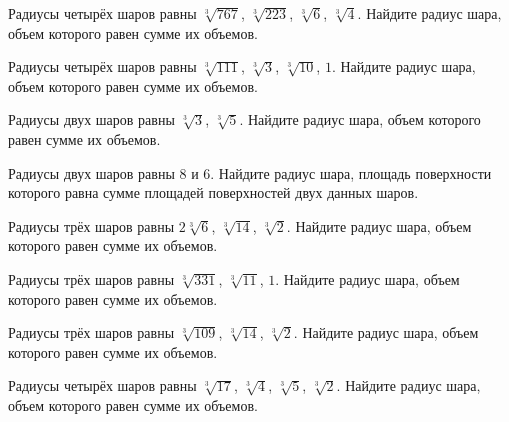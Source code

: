 \documentclass[a4paper]{article}
\begin{document}
\begin{taskBN}{33}
Радиусы четырёх шаров равны $\sqrt[3]{767}$, $\sqrt[3]{223}$, $\sqrt[3]{6}$, $\sqrt[3]{4}$. Найдите радиус шара, объем которого равен сумме их объемов.
\end{taskBN}

\begin{taskBN}{34}
Радиусы четырёх шаров равны $\sqrt[3]{111}$, $\sqrt[3]{3}$, $\sqrt[3]{10}$, $1$. Найдите радиус шара, объем которого равен сумме их объемов.
\end{taskBN}

\begin{taskBN}{35}
Радиусы двух шаров равны $\sqrt[3]{3}$, $\sqrt[3]{5}$. Найдите радиус шара, объем которого равен сумме их объемов.
\end{taskBN}

\begin{taskBN}{36}
Радиусы двух шаров равны $8$ и $6$. Найдите радиус шара, площадь поверхности которого равна сумме площадей поверхностей двух данных шаров.
\end{taskBN}

\begin{taskBN}{37}
Радиусы трёх шаров равны $2\sqrt[3]{6}$, $\sqrt[3]{14}$, $\sqrt[3]{2}$. Найдите радиус шара, объем которого равен сумме их объемов.
\end{taskBN}

\begin{taskBN}{38}
Радиусы трёх шаров равны $\sqrt[3]{331}$, $\sqrt[3]{11}$, $1$. Найдите радиус шара, объем которого равен сумме их объемов.
\end{taskBN}

\begin{taskBN}{39}
Радиусы трёх шаров равны $\sqrt[3]{109}$, $\sqrt[3]{14}$, $\sqrt[3]{2}$. Найдите радиус шара, объем которого равен сумме их объемов.
\end{taskBN}

\begin{taskBN}{40}
Радиусы четырёх шаров равны $\sqrt[3]{17}$, $\sqrt[3]{4}$, $\sqrt[3]{5}$, $\sqrt[3]{2}$. Найдите радиус шара, объем которого равен сумме их объемов.
\end{taskBN}
\end{document}
